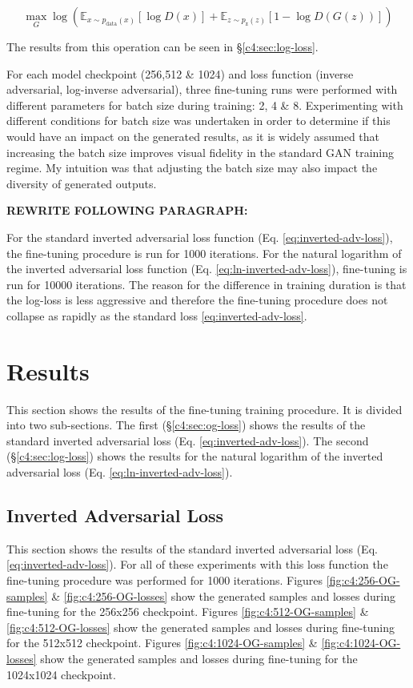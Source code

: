 \begin{equation} 
  \max_{G}\log(\mathbb{E}_{x\sim p_{\text{data}}(x)}[\log{D(x)}] +  \mathbb{E}_{z\sim p_{\text{z}}(z)}[1 - \log{D(G(z))}])
  \label{eq:ln-inverted-adv-loss}
  \end{equation}

The results from this operation can be seen in \S \ref{c4:sec:log-loss}.

For each model checkpoint (256,512 \& 1024) and loss function (inverse adversarial, log-inverse adversarial), three fine-tuning runs were performed with different parameters for batch size during training: 2, 4 \& 8.
Experimenting with different conditions for batch size was undertaken in order to determine if this would have an impact on the generated results, as it is widely assumed that increasing the batch size improves visual fidelity in the standard GAN training regime. 
My intuition was that adjusting the batch size may also impact the diversity of generated outputs.

\textbf{REWRITE FOLLOWING PARAGRAPH:}

For the standard inverted adversarial loss function (Eq. \ref{eq:inverted-adv-loss}), the fine-tuning procedure is run for 1000 iterations.
For the natural logarithm of the inverted adversarial loss function (Eq. \ref{eq:ln-inverted-adv-loss}), fine-tuning is run for 10000 iterations.
The reason for the difference in training duration is that the log-loss is less aggressive and therefore the fine-tuning procedure does not collapse as rapidly as the standard loss \ref{eq:inverted-adv-loss}.

\section{Results}
\label{c4:sec:results}

This section shows the results of the fine-tuning training procedure. 
It is divided into two sub-sections.
The first (\S \ref{c4:sec:og-loss}) shows the results of the standard inverted adversarial loss (Eq. \ref{eq:inverted-adv-loss}).
The second (\S \ref{c4:sec:log-loss}) shows the results for the natural logarithm of the inverted adversarial loss (Eq. \ref{eq:ln-inverted-adv-loss}).

\subsection{Inverted Adversarial Loss}
\FloatBarrier

This section shows the results of the standard inverted adversarial loss (Eq. \ref{eq:inverted-adv-loss}). For all of these experiments with this loss function the fine-tuning procedure was performed for 1000 iterations.
Figures \ref{fig:c4:256-OG-samples} \& \ref{fig:c4:256-OG-losses} show the generated samples and losses during fine-tuning for the 256x256 checkpoint.
Figures \ref{fig:c4:512-OG-samples} \& \ref{fig:c4:512-OG-losses} show the generated samples and losses during fine-tuning for the 512x512 checkpoint.
Figures \ref{fig:c4:1024-OG-samples} \& \ref{fig:c4:1024-OG-losses} show the generated samples and losses during fine-tuning for the 1024x1024 checkpoint.

